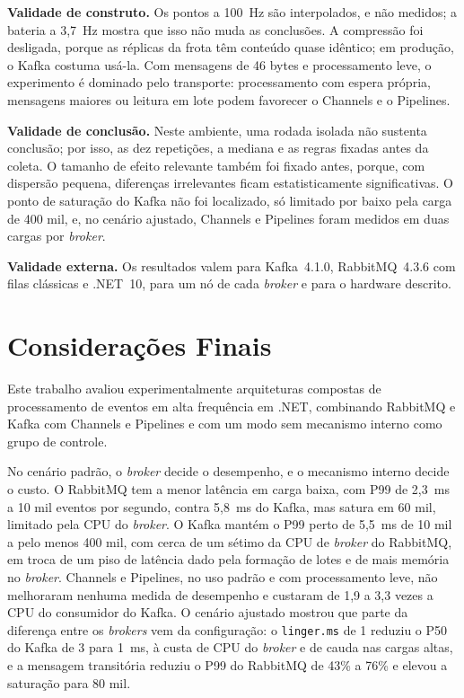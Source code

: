 \documentclass[12pt]{article}
\begin{document}
\textbf{Validade de construto.} Os pontos a 100~Hz são interpolados, e não medidos; a
bateria a 3,7~Hz mostra que isso não muda as conclusões. A compressão foi desligada,
porque as réplicas da frota têm conteúdo quase idêntico; em produção, o Kafka costuma
usá-la. Com mensagens de 46 bytes e processamento leve, o experimento é dominado pelo
transporte: processamento com espera própria, mensagens maiores ou leitura em lote podem
favorecer o Channels e o Pipelines.

\textbf{Validade de conclusão.} Neste ambiente, uma rodada isolada não sustenta
conclusão; por isso, as dez repetições, a mediana e as regras fixadas antes da coleta. O
tamanho de efeito relevante também foi fixado antes, porque, com dispersão pequena,
diferenças irrelevantes ficam estatisticamente significativas. O ponto de saturação do
Kafka não foi localizado, só limitado por baixo pela carga de 400 mil, e, no cenário
ajustado, Channels e Pipelines foram medidos em duas cargas por \textit{broker}.

\textbf{Validade externa.} Os resultados valem para Kafka~4.1.0, RabbitMQ~4.3.6 com filas
clássicas e .NET~10, para um nó de cada \textit{broker} e para o hardware descrito.


\section{Considerações Finais}
\label{sec:conclusao}

Este trabalho avaliou experimentalmente arquiteturas compostas de processamento de eventos
em alta frequência em .NET, combinando RabbitMQ e Kafka com Channels e Pipelines e com um
modo sem mecanismo interno como grupo de controle.

No cenário padrão, o \textit{broker} decide o desempenho, e o mecanismo interno decide o custo. O
RabbitMQ tem a menor latência em carga baixa, com P99 de 2,3~ms a 10 mil eventos por
segundo, contra 5,8~ms do Kafka, mas satura em 60 mil, limitado pela CPU do \textit{broker}. O
Kafka mantém o P99 perto de 5,5~ms de 10 mil a pelo menos 400 mil, com cerca de um sétimo
da CPU de \textit{broker} do RabbitMQ, em troca de um piso de latência dado pela formação de lotes e
de mais memória no \textit{broker}. Channels e Pipelines, no uso padrão e com processamento leve,
não melhoraram nenhuma medida de desempenho e custaram de 1,9 a 3,3 vezes a CPU do
consumidor do Kafka. O cenário ajustado mostrou que parte da diferença entre os \textit{brokers}
vem da configuração: o \texttt{linger.ms} de 1 reduziu o P50 do Kafka de 3 para 1~ms, à
custa de CPU do \textit{broker} e de cauda nas cargas altas, e a mensagem transitória reduziu o P99
do RabbitMQ de 43\% a 76\% e elevou a saturação para 80 mil.
\end{document}
